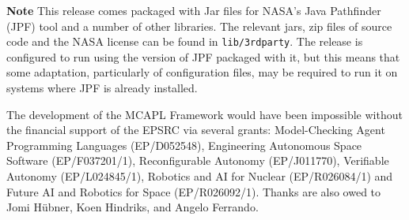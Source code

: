 {\bf Note} This release comes packaged with Jar files for NASA's Java Pathfinder (JPF) tool and a number of other libraries.  The relevant jars, zip files of source code and the NASA license can be found in \texttt{lib/3rdparty}.  The release is configured to run using the version of JPF packaged with it, but this means that some adaptation, particularly of configuration files, may be required to run it on systems where JPF is already installed.

The development of the MCAPL Framework would have been impossible without the financial support of the EPSRC via several grants: Model-Checking Agent Programming Languages (EP/D052548), Engineering Autonomous Space Software (EP/F037201/1), Reconfigurable Autonomy (EP/J011770), Verifiable Autonomy (EP/L024845/1), Robotics and AI for Nuclear (EP/R026084/1) and Future AI and Robotics for Space (EP/R026092/1).  Thanks are also owed to Jomi H\"{u}bner, Koen Hindriks, and Angelo Ferrando.
